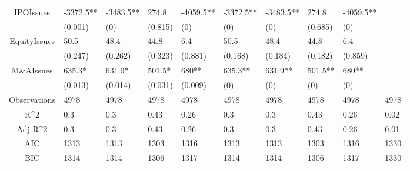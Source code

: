 \documentclass{article}
\begin{document}
\begin{table}[H]
\begin{tabular}{|clllllllll|}
  IPOIssues & -3372.5** & -3483.5** & 274.8 & -4059.5** & -3372.5** & -3483.5** & 274.8 & -4059.5** &  \\ 
   & (0.001) & (0) & (0.815) & (0) & (0) & (0) & (0.685) & (0) &  \\ 
  EquityIssues & 50.5 & 48.4 & 44.8 & 6.4 & 50.5 & 48.4 & 44.8 & 6.4 &  \\ 
   & (0.247) & (0.262) & (0.323) & (0.881) & (0.168) & (0.184) & (0.182) & (0.859) &  \\ 
  M\&AIssues & 635.3* & 631.9* & 501.5* & 680** & 635.3** & 631.9** & 501.5** & 680** &  \\ 
   & (0.013) & (0.014) & (0.031) & (0.009) & (0) & (0) & (0) & (0) &  \\ 
  \hline 
 Observations & 4978 & 4978 & 4978 & 4978 & 4978 & 4978 & 4978 & 4978 & 4978 \\ 
  R^2 & 0.3 & 0.3 & 0.43 & 0.26 & 0.3 & 0.3 & 0.43 & 0.26 & 0.02 \\ 
  Adj R^2 & 0.3 & 0.3 & 0.43 & 0.26 & 0.3 & 0.3 & 0.43 & 0.26 & 0.01 \\ 
  AIC & 1313 & 1313 & 1303 & 1316 & 1313 & 1313 & 1303 & 1316 & 1330 \\ 
  BIC & 1314 & 1314 & 1306 & 1317 & 1314 & 1314 & 1306 & 1317 & 1330 \\ 
   \hline
\end{tabular}
 
\end{table}
\end{document}
